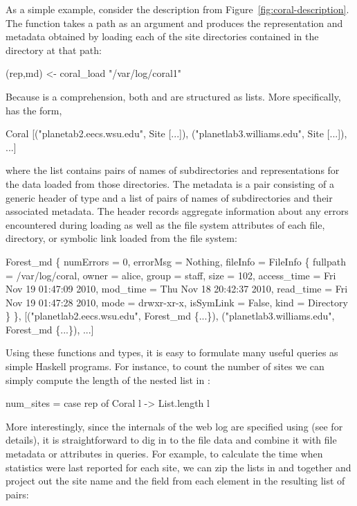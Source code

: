 As a simple example, consider the  description from
Figure~\ref{fig:coral-description}. The  function takes
a path as an argument and produces the representation and metadata
obtained by loading each of the site directories contained in the
directory at that path:
%
\begin{code}
(rep,md) <- coral_load "/var/log/coral1"
\end{code}
Because  is a comprehension, both  and  are
structured as lists. More specifically,  has the form,
\begin{code}
Coral [("planetab2.eecs.wsu.edu", Site [...]),
     ("planetlab3.williams.edu", Site [...]), ...]
\end{code}
where the list contains pairs of names of subdirectories and
representations for the data loaded from those directories. The
metadata is a pair consisting of a generic header of type
 and a list of pairs of names of subdirectories and
their associated metadata. The header records aggregate information
about any errors encountered during loading as well as the file system
attributes of each file, directory, or symbolic link loaded from the
file system:
%
\begin{code}
Forest_md 
  \{ numErrors = 0, 
    errorMsg = Nothing, 
    fileInfo = FileInfo
      \{ fullpath = /var/log/coral, 
        owner = alice, group = staff, size = 102, 
        access_time = Fri Nov 19 01:47:09 2010, 
        mod_time = Thu Nov 18 20:42:37 2010, 
        read_time = Fri Nov 19 01:47:28 2010, 
        mode = drwxr-xr-x, isSymLink = False, 
        kind = Directory \} \},
[("planetlab2.eecs.wsu.edu", Forest_md \{...\}),
 ("planetlab3.williams.edu", Forest_md \{...\}), ...]
\end{code}
%
Using these functions and types, it is easy to formulate many useful
queries as simple Haskell programs. For instance, to count the number
of sites we can simply compute the length of the nested list in
:
%
\begin{code}
num_sites = case rep of Coral l -> List.length l 
\end{code}
%
More interestingly, since the internals of the web log are
specified using \padshaskell{} (see \auxmaterials{} for details), 
it is straightforward to
dig in to the file data and combine it with file metadata
or attributes in queries.  For example,
to calculate the time when statistics were last
reported for each site, we can zip the lists in  and 
together and project out the site name and the  field
from each element in the resulting list of pairs:
%

